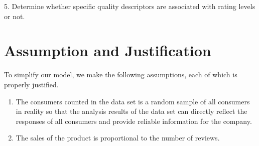 \documentclass[12pt]{mcmthesis}
\begin{document}
\par 5. Determine whether specific quality descriptors are associated with rating levels or not.
%
%
%


\section{Assumption and Justification}
To simplify our model, we make the following assumptions, each of which is properly justified. 
\begin{enumerate}
	\item The consumers counted in the data set is a random sample of all consumers in reality so that the analysis results of the data set can directly reflect the responses of all consumers and provide reliable information for the company.
	
	
	\item The sales of the product is proportional to the number of reviews.
\end{enumerate}
\end{document}
